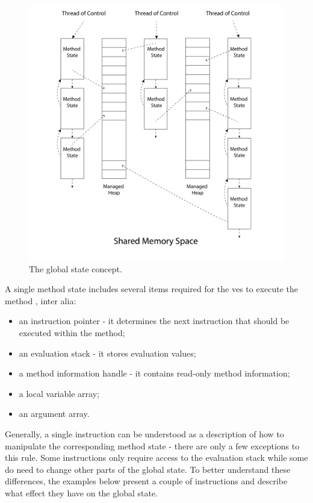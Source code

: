 \documentclass{article}
\numberwithin{equation}{section}
\begin{document}
\begin{figure}
	\includegraphics[width=1\textwidth]{global_state.png}
    \centering
    \caption{The global state concept.}
    \label{fig:global_state}
\end{figure}

A single method state includes several items required for the \acrshort{ves} to execute the method \cite{ecmaStandard}, inter alia:
\begin{itemize}
	\item{an instruction pointer - it determines the next instruction that should be executed within the method;}
	\item{an evaluation stack - it stores evaluation values;}
	\item{a method information handle - it contains read-only method information;}
	\item{a local variable array;}
	\item{an argument array.}
\end{itemize}

Generally, a single instruction can be understood as a description of how to manipulate the corresponding method state - there are only a few exceptions to this rule. Some instructions only require access to the evaluation stack while some do need to change other parts of the global state. To better understand these differences, the examples below present a couple of instructions and describe what effect they have on the global state.
\end{document}
